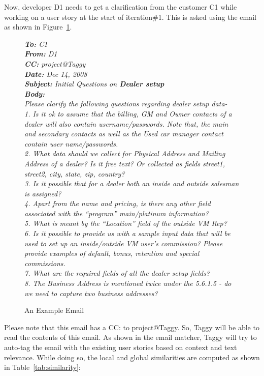 Now, developer D1 needs to get a clarification from the customer C1 while working on a user story at the start of iteration\#1. This is asked using the email as shown in Figure~\ref{fig:email}.

\begin{figure}
	\emph{\textbf{To:} C1}\\
	\emph{\textbf{From:} D1}\\
	\emph{\textbf{CC:} project@Taggy}\\
	\emph{\textbf{Date:} Dec 14, 2008}\\
	\emph{\textbf{Subject:} Initial Questions on \textbf{Dealer setup}}\\
	\emph{\textbf{Body:}\\
	Please clarify the following questions regarding dealer setup data-\\
	1. Is it ok to assume that the billing, GM and Owner contacts of a dealer will also contain username/passwords. Note that, the main and secondary contacts as well as the Used car manager contact contain user name/passwords.\\
	2. What data should we collect for Physical Address and Mailing Address of a dealer? Is it free text? Or collected as fields street1, street2, city, state, zip, country?\\
	3. Is it possible that for a dealer both an inside and outside salesman is assigned?\\
	4. Apart from the name and pricing, is there any other field associated with the ``program'' {main/platinum} information?\\
	5. What is meant by the ``Location'' field of the outside VM Rep?\\
	6. Is it possible to provide us with a sample input data that will be used to set up an inside/outside VM user's commission? Please provide examples of default, bonus, retention and special commissions.\\
	7. What are the required fields of all the dealer setup fields?\\
	8. The Business Address is mentioned twice under the 5.6.1.5 - do we need to capture two business addresses?
	}\\
	\caption{An Example Email}
	\label{fig:email}
\end{figure}

Please note that this email has a CC: to project@Taggy. So, Taggy will be able to read the contents of this email. As shown in the email matcher, Taggy will try to auto-tag the email with the existing user stories based on context and text relevance. While doing so, the local and global similarities are computed as shown in Table~\ref{tab:similarity}:

